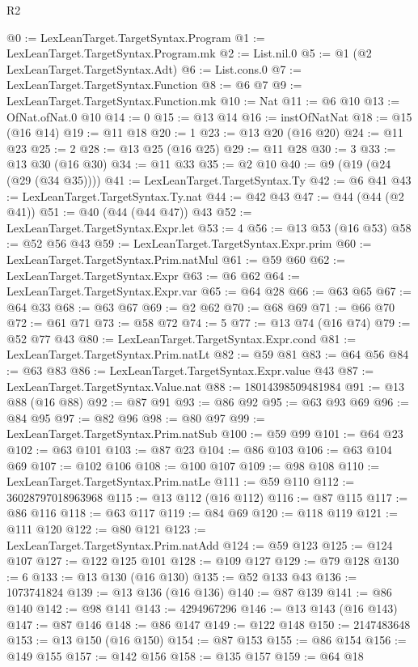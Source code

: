 \begin{lexlean}{R2}
\begin{coremodule}
@0 := LexLeanTarget.TargetSyntax.Program
@1 := LexLeanTarget.TargetSyntax.Program.mk
@2 := List.nil.{0}
@5 := @1 (@2 LexLeanTarget.TargetSyntax.Adt)
@6 := List.cons.{0}
@7 := LexLeanTarget.TargetSyntax.Function
@8 := @6 @7
@9 := LexLeanTarget.TargetSyntax.Function.mk
@10 := Nat
@11 := @6 @10
@13 := OfNat.ofNat.{0} @10
@14 := 0
@15 := @13 @14
@16 := instOfNatNat
@18 := @15 (@16 @14)
@19 := @11 @18
@20 := 1
@23 := @13 @20 (@16 @20)
@24 := @11 @23
@25 := 2
@28 := @13 @25 (@16 @25)
@29 := @11 @28
@30 := 3
@33 := @13 @30 (@16 @30)
@34 := @11 @33
@35 := @2 @10
@40 := @9 (@19 (@24 (@29 (@34 @35))))
@41 := LexLeanTarget.TargetSyntax.Ty
@42 := @6 @41
@43 := LexLeanTarget.TargetSyntax.Ty.nat
@44 := @42 @43
@47 := @44 (@44 (@2 @41))
@51 := @40 (@44 (@44 @47)) @43
@52 := LexLeanTarget.TargetSyntax.Expr.let
@53 := 4
@56 := @13 @53 (@16 @53)
@58 := @52 @56 @43
@59 := LexLeanTarget.TargetSyntax.Expr.prim
@60 := LexLeanTarget.TargetSyntax.Prim.natMul
@61 := @59 @60
@62 := LexLeanTarget.TargetSyntax.Expr
@63 := @6 @62
@64 := LexLeanTarget.TargetSyntax.Expr.var
@65 := @64 @28
@66 := @63 @65
@67 := @64 @33
@68 := @63 @67
@69 := @2 @62
@70 := @68 @69
@71 := @66 @70
@72 := @61 @71
@73 := @58 @72
@74 := 5
@77 := @13 @74 (@16 @74)
@79 := @52 @77 @43
@80 := LexLeanTarget.TargetSyntax.Expr.cond
@81 := LexLeanTarget.TargetSyntax.Prim.natLt
@82 := @59 @81
@83 := @64 @56
@84 := @63 @83
@86 := LexLeanTarget.TargetSyntax.Expr.value @43
@87 := LexLeanTarget.TargetSyntax.Value.nat
@88 := 18014398509481984
@91 := @13 @88 (@16 @88)
@92 := @87 @91
@93 := @86 @92
@95 := @63 @93 @69
@96 := @84 @95
@97 := @82 @96
@98 := @80 @97
@99 := LexLeanTarget.TargetSyntax.Prim.natSub
@100 := @59 @99
@101 := @64 @23
@102 := @63 @101
@103 := @87 @23
@104 := @86 @103
@106 := @63 @104 @69
@107 := @102 @106
@108 := @100 @107
@109 := @98 @108
@110 := LexLeanTarget.TargetSyntax.Prim.natLe
@111 := @59 @110
@112 := 36028797018963968
@115 := @13 @112 (@16 @112)
@116 := @87 @115
@117 := @86 @116
@118 := @63 @117
@119 := @84 @69
@120 := @118 @119
@121 := @111 @120
@122 := @80 @121
@123 := LexLeanTarget.TargetSyntax.Prim.natAdd
@124 := @59 @123
@125 := @124 @107
@127 := @122 @125 @101
@128 := @109 @127
@129 := @79 @128
@130 := 6
@133 := @13 @130 (@16 @130)
@135 := @52 @133 @43
@136 := 1073741824
@139 := @13 @136 (@16 @136)
@140 := @87 @139
@141 := @86 @140
@142 := @98 @141
@143 := 4294967296
@146 := @13 @143 (@16 @143)
@147 := @87 @146
@148 := @86 @147
@149 := @122 @148
@150 := 2147483648
@153 := @13 @150 (@16 @150)
@154 := @87 @153
@155 := @86 @154
@156 := @149 @155
@157 := @142 @156
@158 := @135 @157
@159 := @64 @18

\end{coremodule}
\end{lexlean}
